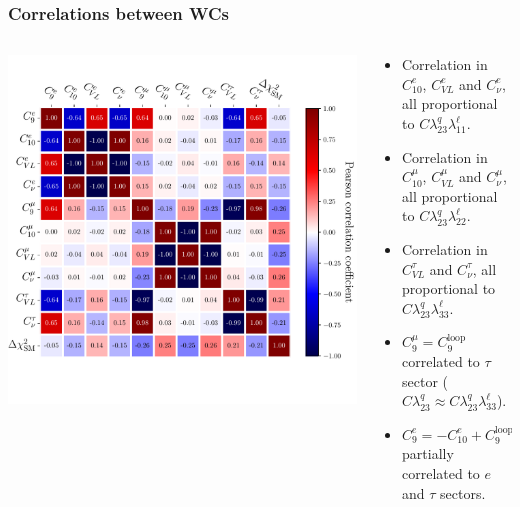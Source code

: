 \documentclass[mathserif, 10pt]{beamer}
\begin{document}
\begin{frame}
  \frametitle{Correlations between WCs}

  \begin{columns}[onlytextwidth]
    \begin{column}{0.6\textwidth}
      \includegraphics[width=\columnwidth,clip]{figures/coeffcorr.pdf}

    \end{column}
    \begin{column}{0.4\textwidth}
      \begin{itemize}
        \item Correlation in $C_{10}^e$, $C_{VL}^e$ and $C_\nu^e$, all proportional to $C \lambda^q_{23} \lambda^\ell_{11}$.
        \item Correlation in $C_{10}^\mu$, $C_{VL}^\mu$ and $C_\nu^\mu$, all proportional to $C \lambda^q_{23} \lambda^\ell_{22}$.
        \item Correlation in $C_{VL}^\tau$ and $C_\nu^\tau$, all proportional to $C \lambda^q_{23} \lambda^\ell_{33}$.
        \item $C_9^\mu = C_9^\mathrm{loop}$ correlated to $\tau$ sector ($C\lambda^q_{23} \approx C\lambda^q_{23} \lambda^\ell_{33}$).
        \item $C_9^e = -C_{10}^e + C_9^\mathrm{loop}$ partially correlated to $e$ and $\tau$ sectors.
      \end{itemize}

    \end{column}
  \end{columns}

\end{frame}
\end{document}
